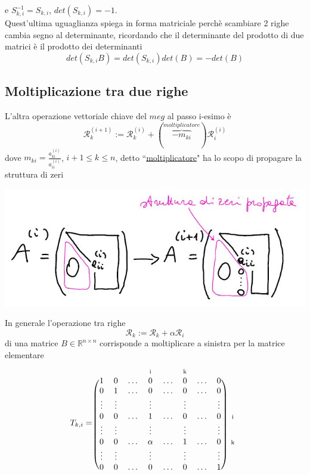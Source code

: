 \documentclass[12pt,a4paper]{article}
\newcommand{\matindex}[1]{\mbox{\scriptsize#1}}%
\begin{document}
e \quad $S^{-1}_{k,i}=S_{k,i}$, \quad   $det(S_{k,i})=-1$.\\Quest'ultima uguaglianza spiega in forma matriciale perchè scambiare 2 righe cambia segno al determinante, ricordando che il determinante del prodotto di due matrici è il prodotto dei determinanti 
\begin{equation*}
    det(S_{k,i}B)=det(S_{k,i})det(B)=-det(B)
\end{equation*}

\subsection{Moltiplicazione tra due righe}
L'altra operazione vettoriale chiave del $meg$ al passo i-esimo è
\begin{equation*}
    \mathcal{R}^{(i+1)}_k:=\mathcal{R}^{(i)}_k+(\overbrace{-m_{ki}}^{moltiplicatore})\mathcal{R}^{(i)}_i
\end{equation*}
dove $m_{ki}=\frac{a_{ki}^{(i)}}{a_{ii}^{(i)}}$, $i+1\leq k\leq n$, detto ``\uline{moltiplicatore}" ha lo scopo di propagare la struttura di zeri
\begin{center}
    \includegraphics[scale=0.5]{calcolo.JPG}    
\end{center}
In generale l'operazione tra righe
\begin{equation*}
    \mathcal{R}_k:=\mathcal{R}_k+\alpha\mathcal{R}_i
\end{equation*}
di una matrice $B\in\mathbb{R}^{n\times n}$ corrisponde a moltiplicare a sinistra per la matrice elementare
\[
    T_{k,i}=\begin{blockarray}{ccccccccc}
    & & & \matindex{i} & &  \matindex{k} & & \\
        \begin{block}{(cccccccc)c}
        1 & 0 & \dots & 0 & \dots & 0 & \dots & 0 \\
        0 & 1 & \dots & 0 & \dots & 0 & \dots & 0 \\
        \vdots & \vdots &  & \vdots &  & \vdots &  & \vdots \\
        0 & 0 & \dots & 1 & \dots & 0 & \dots & 0 & \matindex{i} \\
        \vdots & \vdots &  & \vdots &  & \vdots &  & \vdots \\
        0 & 0 & \dots & \alpha & \dots & 1 & \dots & 0 & \matindex{k} \\
        \vdots & \vdots &  & \vdots &  & \vdots &  & \vdots \\
        0 & 0 & \dots & 0 & \dots & 0 & \dots & 1 \\
        \end{block}
    \end{blockarray}
\]
\end{document}
